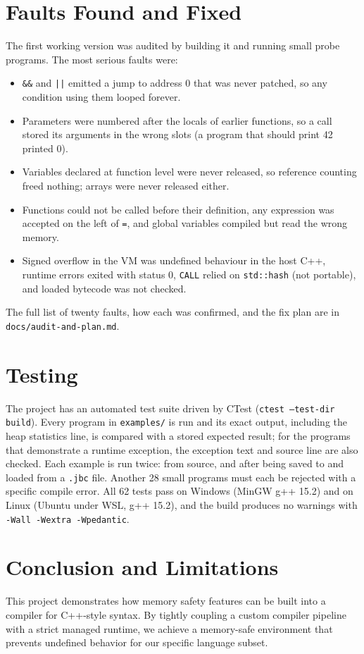 \documentclass[12pt, a4paper]{article}
\begin{document}
\section{Faults Found and Fixed}
The first working version was audited by building it and running small probe programs. The most serious faults were:
\begin{itemize}
    \item \texttt{\&\&} and \texttt{||} emitted a jump to address 0 that was never patched, so any condition using them looped forever.
    \item Parameters were numbered after the locals of earlier functions, so a call stored its arguments in the wrong slots (a program that should print 42 printed 0).
    \item Variables declared at function level were never released, so reference counting freed nothing; arrays were never released either.
    \item Functions could not be called before their definition, any expression was accepted on the left of \texttt{=}, and global variables compiled but read the wrong memory.
    \item Signed overflow in the VM was undefined behaviour in the host C++, runtime errors exited with status 0, \texttt{CALL} relied on \texttt{std::hash} (not portable), and loaded bytecode was not checked.
\end{itemize}
The full list of twenty faults, how each was confirmed, and the fix plan are in \texttt{docs/audit-and-plan.md}.

\section{Testing}
The project has an automated test suite driven by CTest (\texttt{ctest --test-dir build}). Every program in \texttt{examples/} is run and its exact output, including the heap statistics line, is compared with a stored expected result; for the programs that demonstrate a runtime exception, the exception text and source line are also checked. Each example is run twice: from source, and after being saved to and loaded from a \texttt{.jbc} file. Another 28 small programs must each be rejected with a specific compile error. All 62 tests pass on Windows (MinGW g++ 15.2) and on Linux (Ubuntu under WSL, g++ 15.2), and the build produces no warnings with \texttt{-Wall -Wextra -Wpedantic}.

\section{Conclusion and Limitations}
This project demonstrates how memory safety features can be built into a compiler for C++-style syntax. By tightly coupling a custom compiler pipeline with a strict managed runtime, we achieve a memory-safe environment that prevents undefined behavior for our specific language subset.
\end{document}
